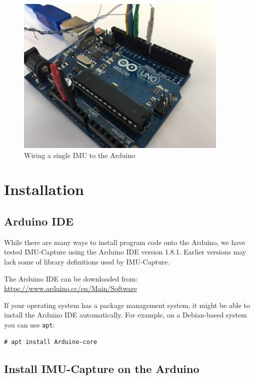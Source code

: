 \documentclass[11pt,letterpaper,article,oneside]{memoir}
\newcommand{\name}{IMU-Capture}
\begin{document}
\begin{figure}[]
    \begin{center}
        \includegraphics[height=3in]{wiring}
    \end{center}
    \label{fig:wiring}
    \caption{Wiring a single IMU to the Arduino}
\end{figure}




\chapter{Installation}

\section{Arduino IDE}
While there are many ways to install program code onto the Arduino, we have
tested \name{} using the Arduino IDE version 1.8.1. Earlier versions may lack
some of library definitions used by \name{}.

The Arduino IDE can be downloaded from:
\url{https://www.arduino.cc/en/Main/Software}

If your operating system has a package management system, it might be able to
install the Arduino IDE automatically. For example, on a Debian-based system you
can use \texttt{apt}:
\begin{verbatim}
# apt install Arduino-core
\end{verbatim}

\section{Install \name{} on the Arduino}
\label{sec:installarduinocode}
\end{document}
